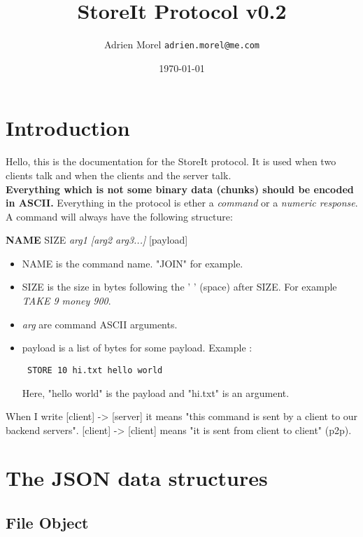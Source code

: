 \documentclass{article}
\begin{document}
  \title{StoreIt Protocol v0.2}
  \author{Adrien Morel \texttt{adrien.morel@me.com}}
  \date{\today}
  \maketitle

\section{Introduction}

Hello, this is the documentation for the StoreIt protocol. It is used when two clients talk and when the clients and the server talk.\\
\textbf{Everything which is not some binary data (chunks) should be encoded in ASCII.} Everything in the protocol is ether a \textit{command} or a \textit{numeric response}. A command will always have the following structure:\\
\begin{center}
\textbf{NAME} SIZE \textit{arg1 [arg2 arg3...]} [payload]
\end{center}

\begin{itemize}
  \item NAME is the command name. "JOIN" for example.
  \item SIZE is the size in bytes following the ' ' (space) after SIZE. For example \textit{TAKE 9 money 900}.
  \item \textit{arg} are command ASCII arguments.
  \item payload is a list of bytes for some payload. Example :\\
\begin{lstlisting}
 STORE 10 hi.txt hello world
\end{lstlisting}
Here, "hello world" is the payload and "hi.txt" is an argument.
\end{itemize}
When I write [client] -> [server] it means "this command is sent by a client to our backend servers". [client] -> [client] means "it is sent from client to client" (p2p).\\
\section{The JSON data structures}
\subsection{File Object}
\end{document}
